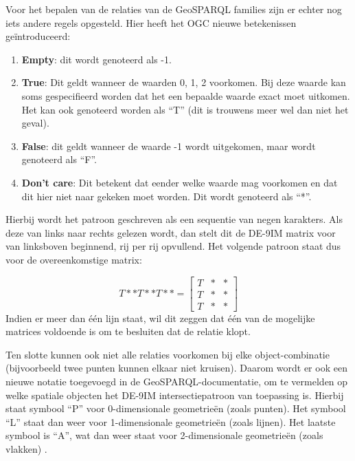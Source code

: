 Voor het bepalen van de relaties van de GeoSPARQL families zijn er echter nog iets andere regels opgesteld. Hier heeft het OGC nieuwe betekenissen geïntroduceerd: 
\begin{enumerate}
    \item \textbf{Empty}: dit wordt genoteerd als -1.
    \item \textbf{True}: Dit geldt wanneer de waarden 0, 1, 2 voorkomen. Bij deze waarde kan soms gespecifieerd worden dat het een bepaalde waarde exact moet uitkomen. Het kan ook genoteerd worden als ``T'' (dit is trouwens meer wel dan niet het geval).
    \item \textbf{False}: dit geldt wanneer de waarde -1 wordt uitgekomen, maar wordt genoteerd als ``F''.
    \item \textbf{Don't care}: Dit betekent dat eender welke waarde mag voorkomen en dat dit hier niet naar gekeken moet worden. Dit wordt genoteerd als ``*''.
\end{enumerate}
Hierbij wordt het patroon geschreven als een sequentie van negen karakters. Als deze van links naar rechts gelezen wordt, dan stelt dit de DE-9IM matrix voor van linksboven beginnend, rij per rij opvullend. Het volgende patroon staat dus voor de overeenkomstige matrix:

\begin{equation*}
    T**T**T** = 
    \begin{bmatrix}
    T & * & *\\
    T & * & *\\
    T & * & *
    \end{bmatrix}
\end{equation*}
Indien er meer dan één lijn staat, wil dit zeggen dat één van de mogelijke matrices voldoende is om te besluiten dat de relatie klopt.

Ten slotte kunnen ook niet alle relaties voorkomen bij elke object-combinatie (bijvoorbeeld twee punten kunnen elkaar niet kruisen). Daarom wordt er ook een nieuwe notatie toegevoegd in de GeoSPARQL-documentatie, om te vermelden op welke spatiale objecten het DE-9IM intersectiepatroon van toepassing is. Hierbij staat symbool ``P'' voor 0-dimensionale geometrieën (zoals punten). Het symbool ``L'' staat dan weer voor 1-dimensionale geometrieën (zoals lijnen). Het laatste symbool is ``A'', wat dan weer staat voor 2-dimensionale geometrieën (zoals vlakken) \cite{ogcdocs}.


